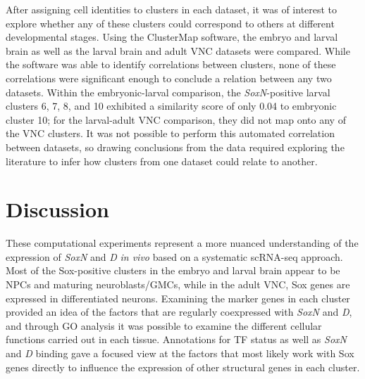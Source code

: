 \documentclass[withindex,glossary]{cam-thesis}
\begin{document}
After assigning cell identities to clusters in each dataset, it was of
interest to explore whether any of these clusters could correspond to
others at different developmental stages. Using the ClusterMap software,
the embryo and larval brain as well as the larval brain and adult VNC
datasets were compared. While the software was able to identify
correlations between clusters, none of these correlations were
significant enough to conclude a relation between any two datasets.
Within the embryonic-larval comparison, the \emph{SoxN}-positive larval
clusters 6, 7, 8, and 10 exhibited a similarity score of only 0.04 to
embryonic cluster 10; for the larval-adult VNC comparison, they did not
map onto any of the VNC clusters. It was not possible to perform this
automated correlation between datasets, so drawing conclusions from the
data required exploring the literature to infer how clusters from one
dataset could relate to another.

\section{Discussion}

These computational experiments represent a more nuanced understanding
of the expression of \emph{SoxN} and \emph{D} \emph{in vivo} based on a
systematic scRNA-seq approach. Most of the Sox-positive clusters in the
embryo and larval brain appear to be NPCs and maturing neuroblasts/GMCs,
while in the adult VNC, Sox genes are expressed in differentiated
neurons. Examining the marker genes in each cluster provided an idea of
the factors that are regularly coexpressed with \emph{SoxN} and
\emph{D}, and through GO analysis it was possible to examine the
different cellular functions carried out in each tissue. Annotations for
TF status as well as \emph{SoxN} and \emph{D} binding gave a focused
view at the factors that most likely work with Sox genes directly to
influence the expression of other structural genes in each cluster.
\end{document}
